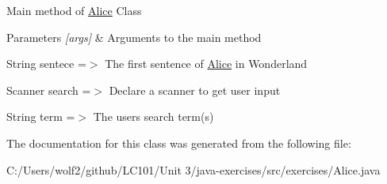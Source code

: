 Main method of \mbox{\hyperlink{classexercises_1_1_alice}{Alice}} Class 
\begin{DoxyParams}{Parameters}
{\em \mbox{[}args\mbox{]}} & Arguments to the main method \\
\hline
\end{DoxyParams}
String sentece =$>$ The first sentence of \mbox{\hyperlink{classexercises_1_1_alice}{Alice}} in Wonderland

Scanner search =$>$ Declare a scanner to get user input

String term =$>$ The user\textquotesingle{}s search term(s) 

The documentation for this class was generated from the following file\+:\begin{DoxyCompactItemize}
\item 
C\+:/\+Users/wolf2/github/\+L\+C101/\+Unit 3/java-\/exercises/src/exercises/Alice.\+java\end{DoxyCompactItemize}
